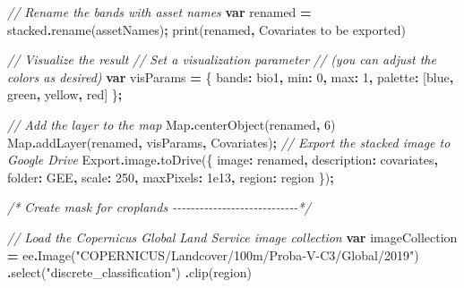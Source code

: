 \documentclass[
  10pt,
  b5paper,
  oneside]{book}
\newenvironment{Shaded}{\begin{snugshade}}{\end{snugshade}}
\newcommand{\AttributeTok}[1]{\textcolor[rgb]{0.77,0.63,0.00}{#1}}
\newcommand{\BuiltInTok}[1]{#1}
\newcommand{\CommentTok}[1]{\textcolor[rgb]{0.56,0.35,0.01}{\textit{#1}}}
\newcommand{\DataTypeTok}[1]{\textcolor[rgb]{0.13,0.29,0.53}{#1}}
\newcommand{\DecValTok}[1]{\textcolor[rgb]{0.00,0.00,0.81}{#1}}
\newcommand{\FloatTok}[1]{\textcolor[rgb]{0.00,0.00,0.81}{#1}}
\newcommand{\FunctionTok}[1]{\textcolor[rgb]{0.00,0.00,0.00}{#1}}
\newcommand{\KeywordTok}[1]{\textcolor[rgb]{0.13,0.29,0.53}{\textbf{#1}}}
\newcommand{\NormalTok}[1]{#1}
\newcommand{\OperatorTok}[1]{\textcolor[rgb]{0.81,0.36,0.00}{\textbf{#1}}}
\newcommand{\StringTok}[1]{\textcolor[rgb]{0.31,0.60,0.02}{#1}}
\begin{document}
\begin{Shaded}
\begin{Highlighting}[]
\CommentTok{// Rename the bands with asset names}
\KeywordTok{var}\NormalTok{ renamed }\OperatorTok{=}\NormalTok{ stacked}\OperatorTok{.}\FunctionTok{rename}\NormalTok{(assetNames)}\OperatorTok{;}
\FunctionTok{print}\NormalTok{(renamed}\OperatorTok{,} \StringTok{\textquotesingle{}Covariates to be exported\textquotesingle{}}\NormalTok{)}

\CommentTok{// Visualize the result}
\CommentTok{// Set a visualization parameter }
\CommentTok{// (you can adjust the colors as desired)}
\KeywordTok{var}\NormalTok{ visParams }\OperatorTok{=}\NormalTok{ \{}
  \DataTypeTok{bands}\OperatorTok{:} \StringTok{\textquotesingle{}bio1\textquotesingle{}}\OperatorTok{,}
  \DataTypeTok{min}\OperatorTok{:} \DecValTok{0}\OperatorTok{,}
  \DataTypeTok{max}\OperatorTok{:} \DecValTok{1}\OperatorTok{,}
  \DataTypeTok{palette}\OperatorTok{:}\NormalTok{ [}\StringTok{\textquotesingle{}blue\textquotesingle{}}\OperatorTok{,} \StringTok{\textquotesingle{}green\textquotesingle{}}\OperatorTok{,} \StringTok{\textquotesingle{}yellow\textquotesingle{}}\OperatorTok{,} \StringTok{\textquotesingle{}red\textquotesingle{}}\NormalTok{]}
\NormalTok{\}}\OperatorTok{;}

\CommentTok{// Add the layer to the map}
\BuiltInTok{Map}\OperatorTok{.}\FunctionTok{centerObject}\NormalTok{(renamed}\OperatorTok{,} \DecValTok{6}\NormalTok{)}
\BuiltInTok{Map}\OperatorTok{.}\FunctionTok{addLayer}\NormalTok{(renamed}\OperatorTok{,}\NormalTok{ visParams}\OperatorTok{,} \StringTok{\textquotesingle{}Covariates\textquotesingle{}}\NormalTok{)}\OperatorTok{;}
\CommentTok{// Export the stacked image to Google Drive}
\NormalTok{Export}\OperatorTok{.}\AttributeTok{image}\OperatorTok{.}\FunctionTok{toDrive}\NormalTok{(\{}
  \DataTypeTok{image}\OperatorTok{:}\NormalTok{ renamed}\OperatorTok{,}
  \DataTypeTok{description}\OperatorTok{:} \StringTok{\textquotesingle{}covariates\textquotesingle{}}\OperatorTok{,}
  \DataTypeTok{folder}\OperatorTok{:} \StringTok{\textquotesingle{}GEE\textquotesingle{}}\OperatorTok{,}
  \DataTypeTok{scale}\OperatorTok{:} \DecValTok{250}\OperatorTok{,}
  \DataTypeTok{maxPixels}\OperatorTok{:} \FloatTok{1e13}\OperatorTok{,}
  \DataTypeTok{region}\OperatorTok{:}\NormalTok{ region}
\NormalTok{\})}\OperatorTok{;}

\CommentTok{/* Create mask for croplands {-}{-}{-}{-}{-}{-}{-}{-}{-}{-}{-}{-}{-}{-}{-}{-}{-}{-}{-}{-}{-}{-}{-}{-}{-}{-}{-}{-}*/}

\CommentTok{// Load the Copernicus Global Land Service image collection}
\KeywordTok{var}\NormalTok{ imageCollection }\OperatorTok{=} 
\NormalTok{ee}\OperatorTok{.}\FunctionTok{Image}\NormalTok{(}\StringTok{"COPERNICUS/Landcover/100m/Proba{-}V{-}C3/Global/2019"}\NormalTok{)}
  \OperatorTok{.}\FunctionTok{select}\NormalTok{(}\StringTok{"discrete\_classification"}\NormalTok{)}
  \OperatorTok{.}\FunctionTok{clip}\NormalTok{(region)}


\end{Highlighting}
\end{Shaded}
\end{document}
